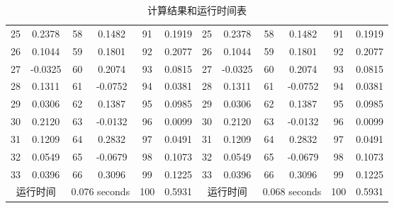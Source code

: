 \documentclass{article}
\begin{document}
\begin{table}[H]
\begin{tabular}{cccccccccccc}
		25       & 0.2378        & 58            & 0.1482            & 91  & 0.1919  & 25       & 0.2378        & 58            & 0.1482            & 91  & 0.1919  \\
		26       & 0.1044        & 59            & 0.1801            & 92  & 0.2077  & 26       & 0.1044        & 59            & 0.1801            & 92  & 0.2077  \\
		27       & -0.0325       & 60            & 0.2074            & 93  & 0.0815  & 27       & -0.0325       & 60            & 0.2074            & 93  & 0.0815  \\
		28       & 0.1311        & 61            & -0.0752           & 94  & 0.0381  & 28       & 0.1311        & 61            & -0.0752           & 94  & 0.0381  \\
		29       & 0.0306        & 62            & 0.1387            & 95  & 0.0985  & 29       & 0.0306        & 62            & 0.1387            & 95  & 0.0985  \\
		30       & 0.2120        & 63            & -0.0132           & 96  & 0.0099  & 30       & 0.2120        & 63            & -0.0132           & 96  & 0.0099  \\
		31       & 0.1209        & 64            & 0.2832            & 97  & 0.0491  & 31       & 0.1209        & 64            & 0.2832            & 97  & 0.0491  \\
		32       & 0.0549        & 65            & -0.0679           & 98  & 0.1073  & 32       & 0.0549        & 65            & -0.0679           & 98  & 0.1073  \\
		33		 & 0.0396  		 &   66			 & 0.3096        & 99  & 0.1225  & 33       & 0.0396        & 66            & 0.3096            & 99  & 0.1225  \\
		\multicolumn{2}{c}{运行时间} & \multicolumn{2}{l}{0.076 seconds} & 100 & 0.5931  & \multicolumn{2}{c}{运行时间} & \multicolumn{2}{c}{0.068 seconds} & 100 & 0.5931 \\
		\bottomrule
	\end{tabular}
	\caption{计算结果和运行时间表}
\end{table}
\end{document}
